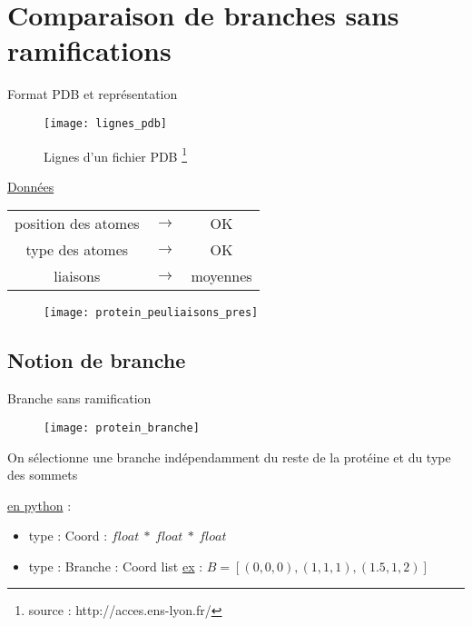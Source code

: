 \section{Comparaison de branches sans ramifications}
\begin{frame}{Format PDB et représentation}
    \footnotesize
    \begin{figure}[!htb]
        \centering
        \texttt{[image: lignes\_pdb]}
        \caption{\label{PDB_tuto:http://acces.ens-lyon.fr/}Lignes d'un fichier PDB \footnote{source : http://acces.ens-lyon.fr/}}
    \end{figure}
    \begin{minipage}{0.45\textwidth}%
    \begin{center}
        \underline{Données}
    \end{center}
    \begin{tabular}{ccc}
    position des atomes & $\rightarrow$ & OK \\
    type des atomes & $\rightarrow$ & OK \\
    liaisons & $\rightarrow$ & moyennes
    \end{tabular}
    \end{minipage}%
    \hfill
    \begin{minipage}{0.45\textwidth}%
    \begin{figure}[!htb]
        \centering
        \texttt{[image: protein\_peuliaisons\_pres]}
    \end{figure}
    \end{minipage}%
\end{frame}

\subsection{Notion de branche}
\begin{frame}{Branche sans ramification}
    \begin{minipage}{0.5\textwidth}%
        \begin{figure}[!htb]
            \centering
            \texttt{[image: protein\_branche]}
        \end{figure}
    \end{minipage}%
    \hfill
    \begin{minipage}{0.4\textwidth}%
        On sélectionne une branche indépendamment du reste de la 
        protéine et du type des sommets
    \end{minipage}%
    \newline \newline \newline
    \underline{en python} : 
    \begin{itemize}
        \item type : \textcolor{airforceblue}{Coord} : $float\ *\ float\ *\ float$
        \item type : \textcolor{airforceblue}{Branche} : Coord list
            \newline \underline{ex} : $B = [(0,0,0), (1,1,1), (1.5,1,2)]$
    \end{itemize}
\end{frame}

